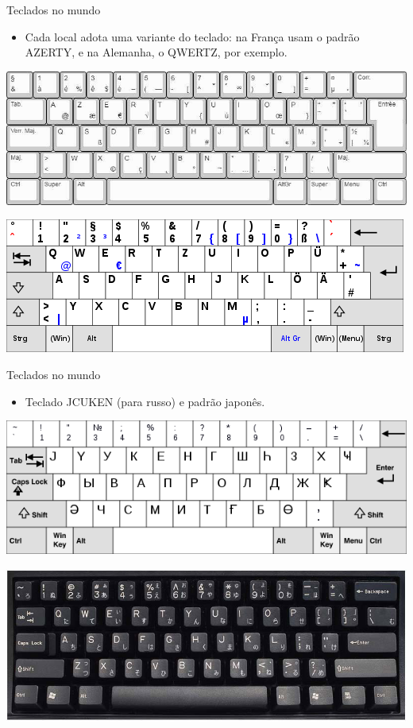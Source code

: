 \begin{frame}{Teclados no mundo}
	\begin{block}{}
		\begin{itemize}
			\item Cada local adota uma variante do teclado: na França usam o padrão AZERTY, e na Alemanha, o QWERTZ, por exemplo.
		\end{itemize}
	\end{block}

	\centering
	\includegraphics[width=0.7\linewidth]{Figuras/Ch02/fig19}

	\medskip

	\includegraphics[width=0.7\linewidth]{Figuras/Ch02/fig20}

\end{frame}


\begin{frame}{Teclados no mundo}
	\begin{block}{}
		\begin{itemize}
			\item Teclado JCUKEN (para russo) e padrão japonês.
		\end{itemize}
	\end{block}

	\centering
	\includegraphics[width=0.75\linewidth]{Figuras/Ch02/fig24}

	\smallskip

	\includegraphics[width=0.75\linewidth]{Figuras/Ch02/fig25}
\end{frame}


